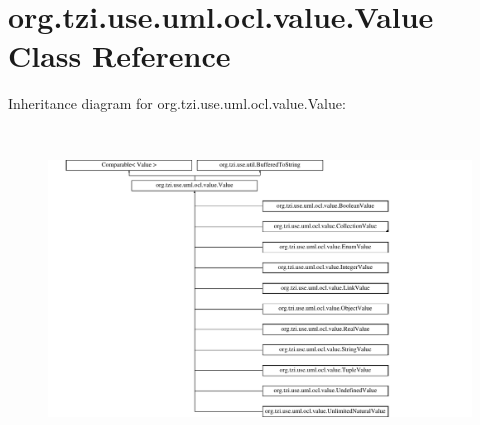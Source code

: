\hypertarget{classorg_1_1tzi_1_1use_1_1uml_1_1ocl_1_1value_1_1_value}{\section{org.\-tzi.\-use.\-uml.\-ocl.\-value.\-Value Class Reference}
\label{classorg_1_1tzi_1_1use_1_1uml_1_1ocl_1_1value_1_1_value}
}
Inheritance diagram for org.\-tzi.\-use.\-uml.\-ocl.\-value.\-Value\-:\begin{figure}[H]
\begin{center}
\leavevmode
\includegraphics[height=8.484848cm]{classorg_1_1tzi_1_1use_1_1uml_1_1ocl_1_1value_1_1_value}
\end{center}
\end{figure}
